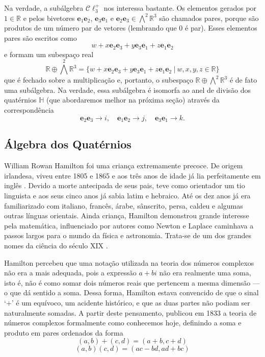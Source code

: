\documentclass[a4paper,12pt]{report}
\theoremstyle{plain}
\theoremstyle{definition}
\begin{document}
	Na verdade, a subálgebra $\mathcal C \ell_3^+$ nos interessa bastante. Os elementos gerados por $1 \in \mathbb{R}$ e pelos bivetores $\mathbf e_1\mathbf e_2$, $\mathbf e_3\mathbf e_1$ e $\mathbf e_2\mathbf e_3 \in \bigwedge^2\mathbb{R}^3$ são chamados pares, porque são produtos de um número par de vetores (lembrando que 0 é par). Esses elementos pares são escritos como $$w+x\mathbf e_2\mathbf e_3 + y \mathbf e_3\mathbf e_1+z\mathbf e_1\mathbf e_2$$ e formam um subespaço real $$\mathbb{R}\oplus\bigwedge^2\mathbb{R}^3 = \{w+x\mathbf e_2\mathbf e_3 + y \mathbf e_3\mathbf e_1+z\mathbf e_1\mathbf e_2 \ | \ w,x,y,z \in \mathbb{R} \}$$
	que é fechado sobre a multiplicação e, portanto, o subespaço $\mathbb{R}\oplus \bigwedge^2\mathbb{R}^3$ é de fato uma subálgebra. Na verdade, essa subálgebra é isomorfa ao anel de divisão dos quatérnios $\mathbb{H}$ (que abordaremos melhor na próxima seção) através da correspondência
	$$ \mathbf e_2\mathbf e_3 \rightarrow i,\quad \mathbf e_1\mathbf e_2 \rightarrow j, \quad \mathbf e_3\mathbf e_1 \rightarrow k.$$
	
	\newpage
	
	\subsection{Álgebra dos Quatérnios}
	William Rowan Hamilton foi uma criança extremamente precoce. De origem irlandesa, viveu entre 1805 e 1865 e aos três anos de idade já lia perfeitamente em inglês \cite{BoyerMathHistory}. Devido a morte antecipada de seus pais, teve como orientador um tio linguista e aos seus cinco anos já sabia latim e hebraico. Até os dez anos já era familiarizado com italiano, francês, árabe, sânscrito, persa, caldeu e algumas outras línguas orientais. Ainda criança, Hamilton demonstrou grande interesse pela matemática, influenciado por autores como Newton e Laplace caminhava a passos largos para o mundo da física e astronomia. Trata-se de um dos grandes nomes da ciência do século XIX \cite{AlgebraAbstrata2BienalSBM}.
	
	Hamilton percebeu que uma notação utilizada na teoria dos números complexos não era a mais adequada, pois a expressão $a + bi$ não era realmente uma soma, isto é, não é como somar dois números reais que pertencem a mesma dimensão --- o que dá sentido a soma. Dessa forma, Hamilton estava convencido de que o sinal ‘$+$’ é um equívoco, um acidente histórico, e que as duas partes não podiam ser naturalmente somadas. A partir deste pensamento, publicou em 1833 a teoria de números complexos formalmente como conhecemos hoje, definindo a soma e produto em pares ordenados da forma
	\begin{equation*}
		(a,b) + (c,d) = (a + b, c + d)
	\end{equation*}
	\begin{equation*}
		(a, b)(c, d) = (ac-bd, ad + bc)
	\end{equation*}
	
\end{document}
